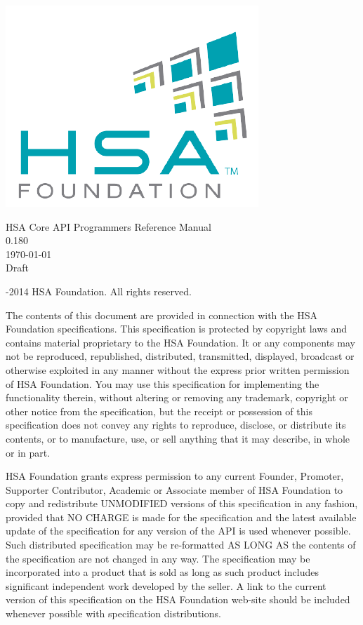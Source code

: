 \documentclass[final]{book}
\newcommand{\docversion}{0.180}
\begin{document}
\hypersetup{pageanchor=false,citecolor=blue}
\begin{titlepage}
\includegraphics[width=.5\textwidth]{fig/foundation.png}
\vspace*{7cm}
\begin{center}
{\Large HSA Core API Programmers Reference Manual\\[1ex]\large\docversion}\\
\vspace*{1cm}
\vspace*{0.5cm}
{\small \today}\\
\vspace*{0.5cm}
{\small Draft}\\
\end{center}
\end{titlepage}
\thispagestyle{empty} {-2014 HSA Foundation. All rights
  reserved.}


The contents of this document are provided in connection with the HSA Foundation
specifications. This specification is protected by copyright laws and contains
material proprietary to the HSA Foundation. It or any components may not be
reproduced, republished, distributed, transmitted, displayed, broadcast or
otherwise exploited in any manner without the express prior written permission
of HSA Foundation. You may use this specification for implementing the
functionality therein, without altering or removing any trademark, copyright or
other notice from the specification, but the receipt or possession of this
specification does not convey any rights to reproduce, disclose, or distribute
its contents, or to manufacture, use, or sell anything that it may describe, in
whole or in part.

HSA Foundation grants express permission to any current Founder, Promoter,
Supporter Contributor, Academic or Associate member of HSA Foundation to copy
and redistribute UNMODIFIED versions of this specification in any fashion,
provided that NO CHARGE is made for the specification and the latest available
update of the specification for any version of the API is used whenever
possible. Such distributed specification may be re-formatted AS LONG AS the
contents of the specification are not changed in any way. The specification may
be incorporated into a product that is sold as long as such product includes
significant independent work developed by the seller. A link to the current
version of this specification on the HSA Foundation web-site should be included
whenever possible with specification distributions.
\end{document}
